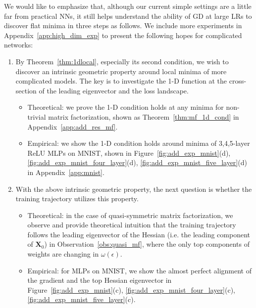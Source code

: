\documentclass{article}
\theoremstyle{plain}
\theoremstyle{remark}
\begin{document}
We would like to emphasize that, although our current simple settings are a little far from practical NNs, it still helps understand the ability of GD at large LRs to discover flat minima in three steps as follows. We include more experiments in Appendix~\ref{app:high_dim_exp} to present the following hopes for complicated networks:

\begin{enumerate}[label=(\alph*)]
    \item By Theorem~\ref{thm:1dlocal}, especially its second condition, we wish to discover an intrinsic geometric property around local minima of more complicated models. The key is to investigate the 1-D function at the cross-section of the leading eigenvector and the loss landscape.

    \begin{itemize}
        \item[\ding{117}] Theoretical: we prove the 1-D condition holds at any minima for non-trivial matrix factorization, shown as Theorem~\ref{thm:mf_1d_cond} in Appendix~\ref{app:add_res_mf}.
        
        \item[\ding{93}] Empirical: we show the 1-D condition holds around minima of 3,4,5-layer ReLU MLPs on MNIST, shown in Figure~\ref{fig:add_exp_mnist}(d), \ref{fig:add_exp_mnist_four_layer}(d), \ref{fig:add_exp_mnist_five_layer}(d) in Appendix~\ref{app:mnist}.
    \end{itemize}

    \item With the above intrinsic geometric property, the next question is whether the training trajectory utilizes this property.

    \begin{itemize}
        \item[\ding{117}] Theoretical: in the case of quasi-symmetric matrix factorization, we observe and provide theoretical intuition that the training trajectory follows the leading eigenvector of the Hessian (i.e. the leading component of $\mathbf{X}_0$) in Observation~\ref{obs:quasi_mf}, where the only top components of weights are changing in $\omega(\epsilon)$.

        \item[\ding{93}] Empirical: for MLPs on MNIST, we show the almost perfect alignment of the gradient and the top Hessian eigenvector in Figure~\ref{fig:add_exp_mnist}(c), \ref{fig:add_exp_mnist_four_layer}(c), \ref{fig:add_exp_mnist_five_layer}(c).
    \end{itemize}


\end{enumerate}
\end{document}
